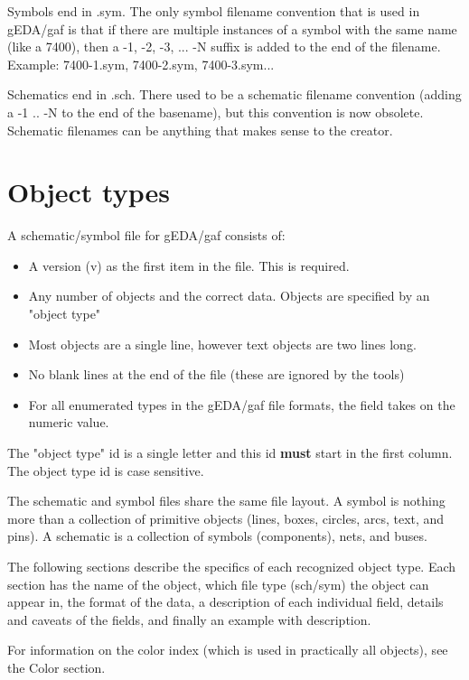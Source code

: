 \documentclass{article}
\begin{document}
Symbols end in .sym.  The only symbol filename convention that is used in
gEDA/gaf is that if there are multiple instances of a symbol with the
same name (like a 7400), then a -1, -2, -3, ... -N suffix is added to
the end of the filename.  Example: 7400-1.sym, 7400-2.sym, 7400-3.sym...

Schematics end in .sch.  There used to be a schematic filename convention
(adding a -1 .. -N to the end of the basename), but this convention is now
obsolete.  Schematic filenames can be anything that makes sense to the 
creator.

\section{Object types}

A schematic/symbol file for gEDA/gaf consists of:

\begin{itemize}
 \item A version (v) as the first item in the file.  This is required.
 \item Any number of objects and the correct data.  Objects are specified 
       by an "object type"
 \item Most objects are a single line, however text objects are two lines long.
 \item No blank lines at the end of the file (these are ignored by the tools)
 \item For all enumerated types in the gEDA/gaf file formats, the field takes
       on the numeric value.
\end{itemize}

The "object type" id is a single letter and this id {\bf must} start in the 
first column.  The object type id is case sensitive.

The schematic and symbol files share the same file layout.  A symbol
is nothing more than a collection of primitive objects (lines, boxes,
circles, arcs, text, and pins).  A schematic is a collection of symbols
(components), nets, and buses.

The following sections describe the specifics of each recognized object 
type.  Each section has the name of the object, which file type (sch/sym)
the object can appear in, the format of the data, a description of
each individual field, details and caveats of the fields, and finally
an example with description.

For information on the color index (which is used in practically all objects),
see the Color section.
\end{document}

